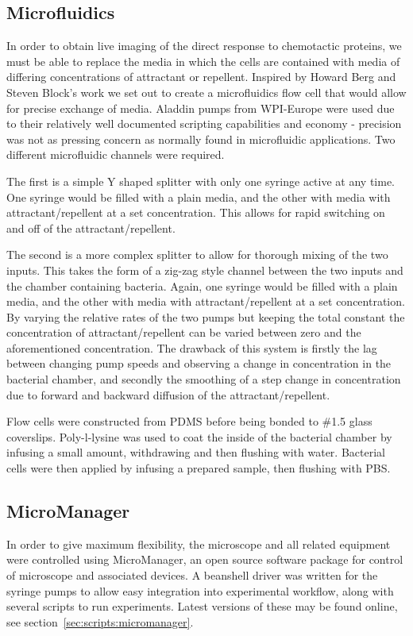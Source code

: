 \documentclass[../main.tex]{subfiles}
\begin{document}
\subsection{Microfluidics}

In order to obtain live imaging of the direct response to chemotactic proteins, we must be able to replace the media in which the cells are contained with media of differing concentrations of attractant or repellent. Inspired by Howard Berg and Steven Block's work\cite{berg84} we set out to create a microfluidics flow cell that would allow for precise exchange of media. Aladdin pumps from WPI-Europe were used due to their relatively well documented scripting capabilities and economy - precision was not as pressing concern as normally found in microfluidic applications. Two different microfluidic channels were required.

The first is a simple Y shaped splitter with only one syringe active at any time. One syringe would be filled with a plain media, and the other with media with attractant/repellent at a set concentration. This allows for rapid switching on and off of the attractant/repellent.

The second is a more complex splitter to allow for thorough mixing of the two inputs. This takes the form of a zig-zag style channel between the two inputs and the chamber containing bacteria. Again, one syringe would be filled with a plain media, and the other with media with attractant/repellent at a set concentration. By varying the relative rates of the two pumps but keeping the total constant the concentration of attractant/repellent can be varied between zero and the aforementioned concentration. The drawback of this system is firstly the lag between changing pump speeds and observing a change in concentration in the bacterial chamber, and secondly the smoothing of a step change in concentration due to forward and backward diffusion of the attractant/repellent.

Flow cells were constructed from PDMS before being bonded to \#1.5 glass coverslips. Poly-l-lysine was used to coat the inside of the bacterial chamber by infusing a small amount, withdrawing and then flushing with water. Bacterial cells were then applied by infusing a prepared sample, then flushing with PBS.

\subsection{MicroManager}

In order to give maximum flexibility, the microscope and all related equipment were controlled using MicroManager\cite{micromanager}, an open source software package for control of microscope and associated devices. A beanshell driver was written for the syringe pumps to allow easy integration into experimental workflow, along with several scripts to run experiments. Latest versions of these may be found online, see section~\ref{sec:scripts:micromanager}.
\end{document}
